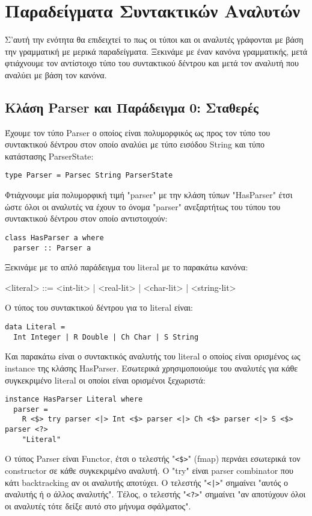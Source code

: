\documentclass[diploma]{softlab-thesis}
\begin{document}
\newpage

\section{Παραδείγματα Συντακτικών Αναλυτών}

Σ'αυτή την ενότητα θα επιδειχτεί το πως οι τύποι και οι αναλυτές
γράφονται με βάση την γραμματική με μερικά παραδείγματα. Ξεκινάμε με
έναν κανόνα γραμματικής, μετά φτιάχνουμε τον αντίστοιχο τύπο του συντακτικού
δέντρου και μετά τον αναλυτή που αναλύει με βάση τον κανόνα.

\subsection{Κλάση Parser και Παράδειγμα 0: Σταθερές}

Έχουμε τον τύπο Parser ο οποίος είναι πολυμορφικός ως προς τον τύπο του
συντακτικού δέντρου στον οποίο αναλύει με τύπο εισόδου String και τύπο
κατάστασης ParserState:
\begin{verbatim}
type Parser = Parsec String ParserState

\end{verbatim}
Φτιάχνουμε μία πολυμορφική τιμή "parser" με την κλάση τύπων "HasParser"
έτσι ώστε όλοι οι αναλυτές να έχουν το όνομα "parser" ανεξαρτήτως του
τύπου του συντακτικού δέντρου στον οποίο αντιστοιχούν:
\begin{verbatim}
class HasParser a where
  parser :: Parser a

\end{verbatim}
Ξεκινάμε με το απλό παράδειγμα του literal με το παρακάτω κανόνα:
\begin{grammar}
<literal> ::= <int-lit> | <real-lit> | <char-lit> | <string-lit>\\
\end{grammar}
Ο τύπος του συντακτικού δέντρου για το literal είναι:
\begin{verbatim}
data Literal =
  Int Integer | R Double | Ch Char | S String

\end{verbatim}
Και παρακάτω είναι ο συντακτικός αναλυτής του literal ο οποίος είναι ορισμένος
ως instance της κλάσης HasParser. Εσωτερικά χρησιμοποιούμε του αναλυτές για
κάθε συγκεκριμένο literal οι οποίοι είναι ορισμένοι ξεχωριστά:
\begin{verbatim}
instance HasParser Literal where
  parser =
    R <$> try parser <|> Int <$> parser <|> Ch <$> parser <|> S <$> parser <?>
    "Literal"

\end{verbatim}
Ο τύπος Parser είναι Functor,  έτσι ο τελεστής "\verb|<$>|" (fmap) περνάει
εσωτερικά τον constructor σε κάθε συγκεκριμένο αναλυτή. Ο "try" είναι
parser combinator που κάτι backtracking αν οι αναλυτής αποτύχει. Ο τελεστής
"\texttt{<|>}" σημαίνει "αυτός ο αναλυτής ή ο άλλος αναλυτής". Τέλος,
ο τελεστής "\verb|<?>|" σημαίνει "αν αποτύχουν όλοι οι αναλυτές τότε
δείξε αυτό στο μήνυμα σφάλματος".
\end{document}
